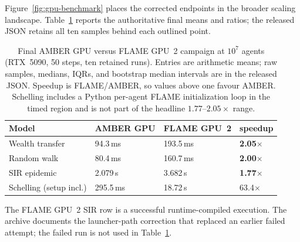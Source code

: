 \documentclass[sigconf,nonacm,review,natbib=true]{acmart}
\theoremstyle{definition}
\theoremstyle{plain}
\theoremstyle{remark}
\begin{document}
Figure~\ref{fig:gpu-benchmark} places the corrected endpoints in the broader
scaling landscape. Table~\ref{tab:flame} reports the authoritative final means
and ratios; the released JSON retains all ten samples behind each outlined point.

\begin{table}[t]
\centering\small
\caption{Final AMBER GPU versus FLAME GPU~2 campaign at $10^7$ agents
(RTX~5090, 50 steps, ten retained runs). Entries are arithmetic means; raw
samples, medians, IQRs, and bootstrap median intervals are in the released JSON.
Speedup is FLAME/AMBER, so values above one favour AMBER. Schelling includes a
Python per-agent FLAME initialization loop in the timed region and is not part
of the headline $1.77$--$2.05\times$ range.}
\label{tab:flame}
\begin{tabular}{@{}llll@{}}
\toprule
Model & AMBER GPU & FLAME GPU~2 & speedup \\
\midrule
Wealth transfer & 94.3\,ms & 193.5\,ms & \textbf{2.05$\times$} \\
Random walk & 80.4\,ms & 160.7\,ms & \textbf{2.00$\times$} \\
SIR epidemic & 2.079\,s & 3.682\,s & \textbf{1.77$\times$} \\
Schelling (setup incl.) & 295.5\,ms & 18.72\,s & 63.4$\times$ \\
\bottomrule
\end{tabular}
\end{table}

The FLAME GPU~2 SIR row is a successful runtime-compiled execution. The archive
documents the launcher-path correction that replaced an earlier failed attempt;
the failed run is not used in Table~\ref{tab:flame}.
\end{document}
